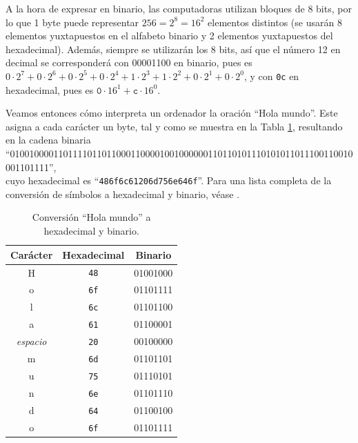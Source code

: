 A la hora de expresar en binario, las computadoras utilizan bloques de 8 bits, por lo que 1 byte puede representar $256 = 2^8 = 16^2$ elementos distintos (se usarán 8 elementos yuxtapuestos en el alfabeto binario y 2 elementos yuxtapuestos del hexadecimal). Además, siempre se utilizarán los 8 bits, así que el número 12 en decimal se corresponderá con 00001100 en binario, pues es $0\cdot 2^7+0\cdot 2^6+0\cdot 2^5+0\cdot 2^4 + 1\cdot 2^3 +1\cdot 2^2+ 0\cdot 2^1+ 0\cdot 2^0$, y con \texttt{0c} en hexadecimal, pues es $\texttt{0}\cdot 16^1 + \texttt{c}\cdot16^0$.

Veamos entonces cómo interpreta un ordenador la oración ``Hola mundo''. Este asigna a cada carácter un byte, tal y como se muestra en la Tabla \ref{HolaMundo_bin_hex}, resultando en la cadena binaria \\[0.3ex] ``01001000011011110110110001100001001000000110110101110101011011100110010001101111'',\\[0.3ex]
cuyo hexadecimal es ``\texttt{486f6c61206d756e646f}''. Para una lista completa de la conversión de símbolos a hexadecimal y binario, véase \cite{symbl_unicode}.



\begin{table}[H]
\centering
\begin{tabular}{ccc}
\hline
\textbf{Carácter} & \textbf{Hexadecimal} & \textbf{Binario} \\ \hline
H & \texttt{48} & 01001000 \\
o & \texttt{6f} & 01101111 \\
l & \texttt{6c} & 01101100 \\
a & \texttt{61} & 01100001 \\
\textit{espacio} & \texttt{20} & 00100000 \\
m & \texttt{6d} & 01101101 \\
u & \texttt{75} & 01110101 \\
n & \texttt{6e} & 01101110 \\
d & \texttt{64} & 01100100 \\
o & \texttt{6f} & 01101111 \\ \hline
\end{tabular}
\caption{Conversión ``Hola mundo'' a hexadecimal y binario.}
\label{HolaMundo_bin_hex}
\end{table}